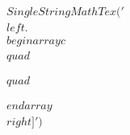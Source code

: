 \documentclass[preview]{standalone}
\begin{document}
\begin{align*}
SingleStringMathTex('\\left.\\begin{array}{c}\\quad \\\\\\quad \\\\\\end{array}\\right]')
\end{align*}
\end{document}

